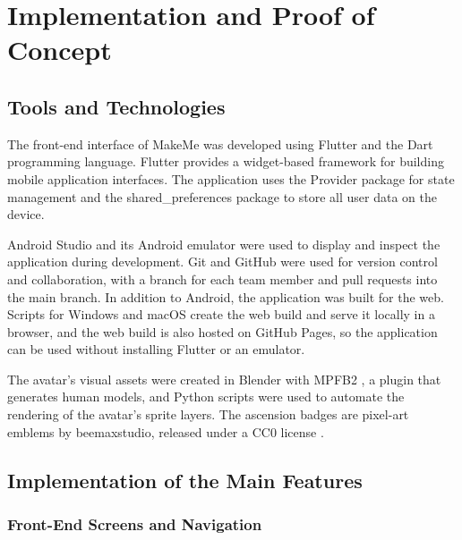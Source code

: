 \documentclass[11pt]{article}
\begin{document}
\section{Implementation and Proof of Concept}

\subsection{Tools and Technologies}

The front-end interface of MakeMe was developed using Flutter and the Dart programming language. Flutter provides a
widget-based framework for building mobile application interfaces. The application uses the Provider package
\cite{provider} for state management and the shared\_preferences package \cite{sharedpreferences} to store all user
data on the device.

Android Studio and its Android emulator were used to display and inspect the application during development. Git and
GitHub were used for version control and collaboration, with a branch for each team member and pull requests into the
main branch. In addition to Android, the application was built for the web. Scripts for Windows and macOS create the
web build and serve it locally in a browser, and the web build is also hosted on GitHub Pages, so the application can
be used without installing Flutter or an emulator.

The avatar's visual assets were created in Blender \cite{blender} with MPFB2 \cite{mpfb2}, a plugin that generates
human models, and Python scripts were used to automate the rendering of the avatar's sprite layers. The ascension
badges are pixel-art emblems by beemaxstudio, released under a CC0 license \cite{beemaxbadges}.

\subsection{Implementation of the Main Features}


\subsubsection{Front-End Screens and Navigation}
\end{document}
